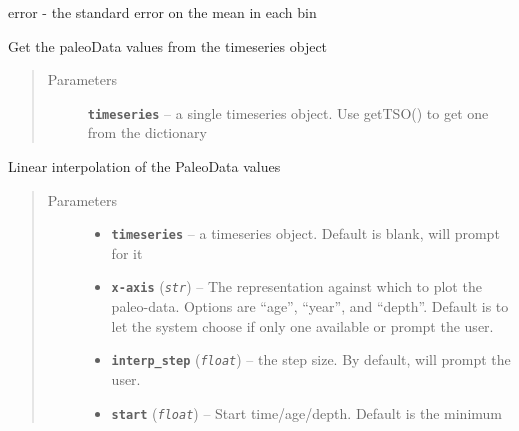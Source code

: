 \documentclass[letterpaper,10pt,english]{sphinxmanual}
\begin{document}
\begin{fulllineitems}
\begin{fulllineitems}
\begin{description}
error - the standard error on the mean in each bin

\end{description}

\end{fulllineitems}


\begin{fulllineitems}
\label{Basic:pyleoclim.Basic.getValues}
Get the paleoData values from the timeseries object
\begin{quote}\begin{description}
\item[{Parameters}] \leavevmode
\textbf{\texttt{timeseries}} -- a single timeseries object. Use getTSO() to get
one from the dictionary

\end{description}\end{quote}

\end{fulllineitems}


\begin{fulllineitems}
\label{Basic:pyleoclim.Basic.interp_Ts}
Linear interpolation of the PaleoData values
\begin{quote}\begin{description}
\item[{Parameters}] \leavevmode\begin{itemize}
\item {} 
\textbf{\texttt{timeseries}} -- a timeseries object. Default is blank, will prompt for it

\item {} 
\textbf{\texttt{x-axis}} (\emph{\texttt{str}}) -- The representation against which to plot the
paleo-data. Options are ``age'', ``year'', and ``depth''.
Default is to let the system choose if only one available
or prompt the user.

\item {} 
\textbf{\texttt{interp\_step}} (\emph{\texttt{float}}) -- the step size. By default, will prompt the user.

\item {} 
\textbf{\texttt{start}} (\emph{\texttt{float}}) -- Start time/age/depth. Default is the minimum


\end{itemize}
\end{description}
\end{quote}
\end{fulllineitems}
\end{fulllineitems}
\end{document}
